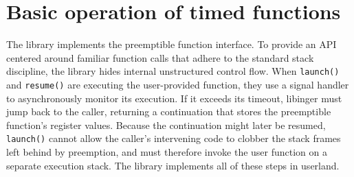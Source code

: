 \section{Basic operation of timed functions}
\label{sec:libinger}

%
%
%
%

The \libinger{} library implements the preemptible function interface.
To provide an API centered around familiar function calls that adhere to the standard
stack discipline, the library hides internal unstructured control flow.
When \texttt{launch()} and \texttt{resume()} are executing the user-provided
function, they use a signal handler to asynchronously monitor its execution.  If
it exceeds its timeout, libinger must jump back to the caller, returning a
continuation that stores the preemptible function's register values.
Because the continuation might later be resumed, \texttt{launch()} cannot allow the
caller's intervening code to clobber the stack frames left behind by preemption, and
must therefore invoke the user function on a separate execution stack.  The library
implements all of these steps in userland.

